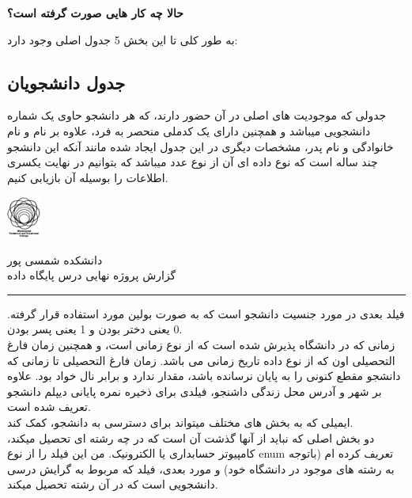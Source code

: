 \documentclass{article}
\begin{document}
{\par\large \textbf{ حالا چه کار هایی صورت گرفته است؟} \par}

به طور کلی تا این بخش 5 جدول اصلی وجود دارد:\\
\subsection{جدول دانشجویان}
جدولی که موجودیت های اصلی در آن حضور دارند، که هر دانشجو حاوی یک
شماره دانشجویی میباشد و همچنین دارای یک کدملی منحصر به فرد، علاوه بر
نام و نام خانوادگی و نام پدر، مشخصات دیگری در این جدول ایجاد شده مانند آنکه
این دانشجو چند ساله است که نوع داده ای آن از نوع عدد میباشد که بتوانیم در نهایت
یکسری اطلاعات را بوسیله آن بازیابی کنیم.\\

\begin{minipage}{0.1\textwidth}%
  \includegraphics[width=1.1cm]{tvu.png}
  \end{minipage}%
  \hfill%
  \begin{minipage}{0.9\textwidth}\raggedleft
  دانشکده شمسی پور\\
  گزارش پروژه نهایی درس پایگاه داده\\
  \end{minipage}

\par\noindent\rule{\textwidth}{3pt}



فیلد بعدی در مورد جنسیت دانشجو است که به صورت 
بولین مورد استفاده قرار گرفته. 0 یعنی دختر بودن و 1 یعنی پسر بودن.\\

زمانی که در دانشگاه پذیرش شده است که از نوع زمانی است، و همچنین زمان فارغ التحصیلی اون که از نوع داده تاریخ زمانی می باشد.
زمان فارغ التحصیلی تا زمانی که 
دانشجو مقطع کنونی را به پایان نرسانده باشد، مقدار ندارد و برابر نال خواد بود.
علاوه بر شهر و آدرس محل زندگی داشنجو، فیلدی برای ذخیره نمره پایانی دیپلم دانشجو تعریف شده است.
\\
ایمیلی که به بخش های مختلف میتواند برای دسترسی به دانشجو، کمک کند.\\

دو بخش اصلی که نباید از آنها گذشت آن است که در چه رشته ای تحصیل میکند، کامپیوتر حسابداری
یا الکترونیک. من این فیلد را از نوع 
enum 
تعریف کرده ام (باتوجه به رشته های موجود در دانشگاه خود)
و مورد بعدی،
فیلد 
که مربوط به گرایش درسی دانشجویی است که در آن رشته تحصیل میکند.
\end{document}
